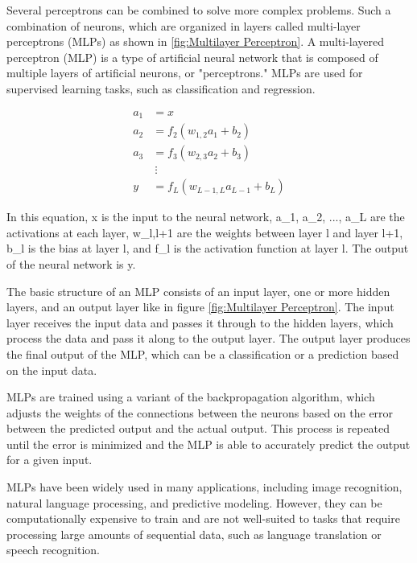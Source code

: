 \documentclass{book}
\begin{document}
	Several perceptrons can be combined to solve more complex problems. Such a
	combination of neurons, which are organized in layers called multi-layer perceptrons (MLPs) as shown in \ref{fig:Multilayer Perceptron}. A multi-layered perceptron (MLP) is a type of artificial neural network that is composed of multiple layers of artificial neurons, or "perceptrons." MLPs are used for supervised learning tasks, such as classification and regression.
	
	\begin{align*}
	a_1 &= x \\
	a_2 &= f_2(w_{1,2} a_1 + b_2) \\
	a_3 &= f_3(w_{2,3} a_2 + b_3) \\
	& \ \vdots \\
	y &= f_L(w_{L-1,L} a_{L-1} + b_L)
	\end{align*}
	
	In this equation, x is the input to the neural network, a\_1, a\_2, ..., a\_L are the activations at each layer, w\_{l,l+1} are the weights between layer l and layer l+1, b\_l is the bias at layer l, and f\_l is the activation function at layer l. The output of the neural network is y.
	
	The basic structure of an MLP consists of an input layer, one or more hidden layers, and an output layer like in figure \ref{fig:Multilayer Perceptron}. The input layer receives the input data and passes it through to the hidden layers, which process the data and pass it along to the output layer. The output layer produces the final output of the MLP, which can be a classification or a prediction based on the input data.
	
	MLPs are trained using a variant of the backpropagation algorithm, which adjusts the weights of the connections between the neurons based on the error between the predicted output and the actual output. This process is repeated until the error is minimized and the MLP is able to accurately predict the output for a given input.
	
	MLPs have been widely used in many applications, including image recognition, natural language processing, and predictive modeling. However, they can be computationally expensive to train and are not well-suited to tasks that require processing large amounts of sequential data, such as language translation or speech recognition.
	
\end{document}
